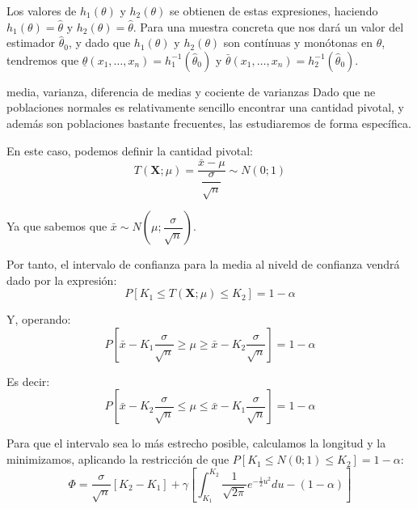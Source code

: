 Los valores de $h_1(\theta)$ y $h_2(\theta)$ se obtienen de estas expresiones, haciendo  $h_1(\theta)=\hat{\theta}$ y $h_2(\theta)=\hat{\theta}$. Para una muestra concreta que nos dar\'a un valor del estimador $\hat{\theta}_0$, y dado que $h_1(\theta)$ y $h_2(\theta)$ son cont\'inuas y mon\'otonas en $\theta$, tendremos que $\underline{\theta}(x_1,\ldots,x_n)=h_1^{-1}(\hat{\theta}_0)$ y $\bar{\theta}(x_1,\ldots,x_n)=h_2^{-1}(\hat{\theta}_0)$.


media, varianza, diferencia de medias y cociente de varianzas
Dado que ne poblaciones normales es relativamente sencillo encontrar una cantidad pivotal, y adem\'as son poblaciones bastante frecuentes, las estudiaremos de forma espec\'ifica.



En este caso, podemos definir la cantidad pivotal:
\begin{equation*}
T(\boldsymbol{X};\mu)=\dfrac{\bar{x}-\mu}{\dfrac{\sigma}{\sqrt{n}}}\sim N(0;1)
\end{equation*}

Ya que sabemos que $\bar{x}\sim N(\mu;\dfrac{\sigma}{\sqrt{n}})$.

Por tanto, el intervalo de confianza para la media al niveld de confianza vendr\'a dado por la expresi\'on:
\begin{equation*}
P[K_1\leq T(\boldsymbol{X};\mu)\leq K_2]=1-\alpha
\end{equation*}

Y, operando:
\begin{equation*}
P[\bar{x}-K_1\dfrac{\sigma}{\sqrt{n}}\geq\mu\geq\bar{x}-K_2\dfrac{\sigma}{\sqrt{n}}]=1-\alpha
\end{equation*}

Es decir:
\begin{equation*}
P[\bar{x}-K_2\dfrac{\sigma}{\sqrt{n}}\leq\mu\leq\bar{x}-K_1\dfrac{\sigma}{\sqrt{n}}]=1-\alpha
\end{equation*}

Para que el intervalo sea lo m\'as estrecho posible, calculamos la longitud y la minimizamos, aplicando la restricci\'on de que $P[K_1\leq N(0;1)\leq K_2]=1-\alpha$:
\begin{equation*}
\varPhi=\dfrac{\sigma}{\sqrt{n}}\left[K_2-K_1\right]+\gamma\left[\int_{K_1}^{K_2}\dfrac{1}{\sqrt{2\pi}}e^{-\frac{1}{2}u^2}du-(1-\alpha)\right]
\end{equation*}

